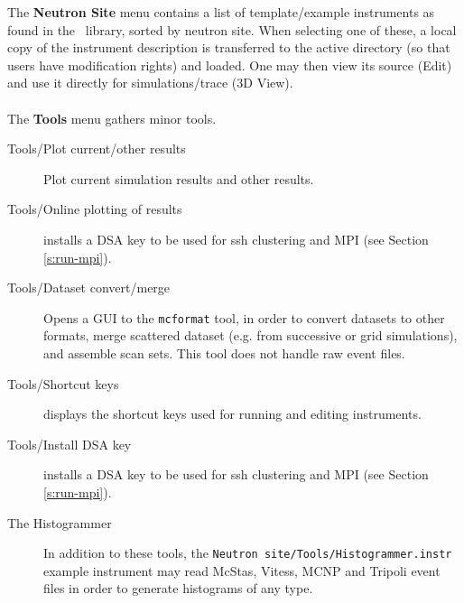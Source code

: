 \noindent The {\bf Neutron Site} menu contains a list of template/example
instruments as found in the \MCS\ library, sorted by neutron site. When
selecting one of these, a local copy of the instrument description is
transferred to the active directory (so that users have modification rights) and
loaded. One may then view its source (Edit) and use it directly for
simulations/trace (3D View).
\\\ \\

\noindent The {\bf Tools} menu gathers minor tools.
\begin{description}
\item[Tools/Plot current/other results] Plot current simulation results and
  other results.
\item[Tools/Online plotting of results] installs a DSA key to be used for ssh
  clustering and MPI (see Section \ref{s:run-mpi}).
\item[Tools/Dataset convert/merge] Opens a GUI to the \verb+mcformat+ tool, in
  order to convert datasets to other formats, merge scattered dataset (e.g. from
  successive or grid simulations), and assemble scan sets. This tool does not
  handle raw event files.
\item[Tools/Shortcut keys] displays the shortcut keys used for running and
  editing instruments.
\item[Tools/Install DSA key] installs a DSA key to be used for ssh clustering
  and MPI (see Section \ref{s:run-mpi}).
\item[The Histogrammer] In addition to these tools, the
  \verb+Neutron site/Tools/Histogrammer.instr+ example instrument may read
  McStas, Vitess, MCNP and Tripoli event files in order to generate histograms
  of any type.
\end{description}


